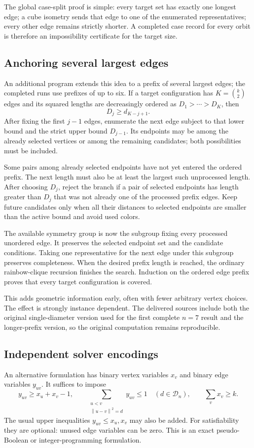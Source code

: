 \documentclass[11pt,letterpaper]{article}
\theoremstyle{definition}
\newcommand{\norm}[1]{\left\lVert #1\right\rVert}
\newcommand{\calD}{\mathcal D}
\begin{document}
The global case-split proof is simple: every target set has exactly one
longest edge; a cube isometry sends that edge to one of the enumerated
representatives; every other edge remains strictly shorter. A completed
case record for every orbit is therefore an impossibility certificate
for the target size.

\subsection{Anchoring several largest edges}
\label{sec:edge-prefix}
An additional program extends this idea to a prefix of several largest
edges; the completed runs use prefixes of up to six. If a target
configuration has \(K=\binom{k}{2}\)
edges and its squared lengths are decreasingly ordered as
\(D_1>\cdots>D_K\), then
\[
 D_j\ge d_{K-j+1}.
\]
After fixing the first \(j-1\) edges, enumerate the next edge subject
to that lower bound and the strict upper bound \(D_{j-1}\).
Its endpoints may be among the already selected vertices or among the
remaining candidates; both possibilities must be included.

Some pairs among already selected endpoints have not yet entered the
ordered prefix. The next length must also be at least the largest such
unprocessed length. After choosing \(D_j\), reject the branch if a pair
of selected endpoints has length greater than \(D_j\) that was not
already one of the processed prefix edges. Keep future candidates
only when all their distances to selected endpoints are smaller than
the active bound and avoid used colors.

The available symmetry group is now the subgroup fixing every processed
unordered edge. It preserves the selected endpoint set and the candidate
conditions. Taking one representative for the next edge under this
subgroup preserves completeness. When the desired prefix length is
reached, the ordinary rainbow-clique recursion finishes the search.
Induction on the ordered edge prefix proves that every target
configuration is covered.

This adds geometric information early, often with fewer arbitrary
vertex choices. The effect is strongly instance dependent. The
delivered sources include both the original single-diameter version
used for the first complete \(n=7\) result and the longer-prefix version,
so the original computation remains reproducible.

\subsection{Independent solver encodings}
An alternative formulation has binary vertex variables \(x_v\) and
binary edge variables \(y_{uv}\). It suffices to impose
\[
 y_{uv}\ge x_u+x_v-1,\qquad
 \sum_{\substack{u<v\\\norm{u-v}^2=d}}y_{uv}\le1
 \quad(d\in\calD_n),\qquad
 \sum_vx_v\ge k.
\]
The usual upper inequalities \(y_{uv}\le x_u,x_v\) may also be added.
For satisfiability they are optional: unused edge variables can be zero.
This is an exact pseudo-Boolean or integer-programming formulation.
\end{document}
